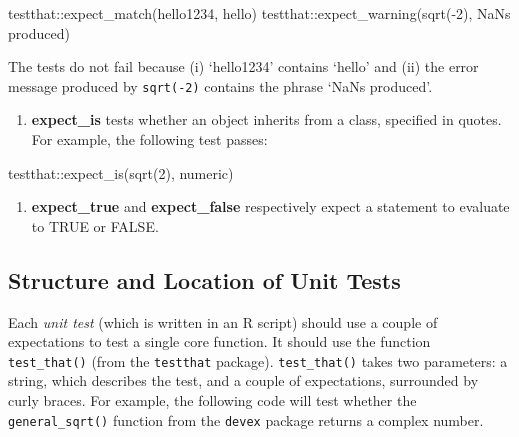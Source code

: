 \documentclass[
]{book}
\newenvironment{Shaded}{\begin{snugshade}}{\end{snugshade}}
\newcommand{\DecValTok}[1]{\textcolor[rgb]{0.00,0.00,0.81}{#1}}
\newcommand{\FunctionTok}[1]{\textcolor[rgb]{0.00,0.00,0.00}{#1}}
\newcommand{\NormalTok}[1]{#1}
\newcommand{\SpecialCharTok}[1]{\textcolor[rgb]{0.00,0.00,0.00}{#1}}
\newcommand{\StringTok}[1]{\textcolor[rgb]{0.31,0.60,0.02}{#1}}
\providecommand{\tightlist}{%
  \setlength{\itemsep}{0pt}\setlength{\parskip}{0pt}}
\begin{document}
\begin{Shaded}
\begin{Highlighting}[]
\NormalTok{testthat}\SpecialCharTok{::}\FunctionTok{expect\_match}\NormalTok{(}\StringTok{\textquotesingle{}hello1234\textquotesingle{}}\NormalTok{, }\StringTok{\textquotesingle{}hello\textquotesingle{}}\NormalTok{)}
\NormalTok{testthat}\SpecialCharTok{::}\FunctionTok{expect\_warning}\NormalTok{(}\FunctionTok{sqrt}\NormalTok{(}\SpecialCharTok{{-}}\DecValTok{2}\NormalTok{), }\StringTok{\textquotesingle{}NaNs produced\textquotesingle{}}\NormalTok{)}
\end{Highlighting}
\end{Shaded}

The tests do not fail because (i) `hello1234' contains `hello' and (ii) the error message produced by \texttt{sqrt(-2)} contains the phrase `NaNs produced'.

\begin{enumerate}
\def\labelenumi{\arabic{enumi}.}
\setcounter{enumi}{3}
\tightlist
\item
  \textbf{expect\_is} tests whether an object inherits from a class, specified in quotes. For example, the following test passes:
\end{enumerate}

\begin{Shaded}
\begin{Highlighting}[]
\NormalTok{testthat}\SpecialCharTok{::}\FunctionTok{expect\_is}\NormalTok{(}\FunctionTok{sqrt}\NormalTok{(}\DecValTok{2}\NormalTok{), }\StringTok{\textquotesingle{}numeric\textquotesingle{}}\NormalTok{)}
\end{Highlighting}
\end{Shaded}

\begin{enumerate}
\def\labelenumi{\arabic{enumi}.}
\setcounter{enumi}{4}
\tightlist
\item
  \textbf{expect\_true} and \textbf{expect\_false} respectively expect a statement to evaluate to TRUE or FALSE.
\end{enumerate}

\hypertarget{structure-and-location-of-unit-tests}{%
\subsection{Structure and Location of Unit Tests}\label{structure-and-location-of-unit-tests}}

Each \emph{unit test} (which is written in an R script) should use a couple of expectations to test a single core function. It should use the function \texttt{test\_that()} (from the \texttt{testthat} package). \texttt{test\_that()} takes two parameters: a string, which describes the test, and a couple of expectations, surrounded by curly braces. For example, the following code will test whether the \texttt{general\_sqrt()} function from the \texttt{devex} package returns a complex number.
\end{document}
